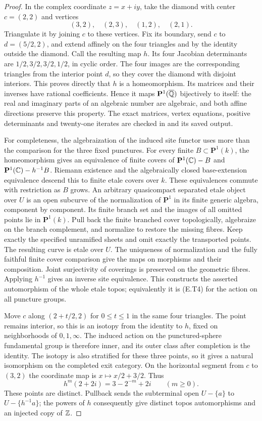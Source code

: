 \begin{proof}
In the complex coordinate $z=x+iy$, take the diamond with center
$c=(2,2)$ and vertices
\[
 (3,2),\quad(2,3),\quad(1,2),\quad(2,1).
\]
Triangulate it by joining $c$ to these vertices.  Fix its boundary,
send $c$ to $d=(5/2,2)$, and extend affinely on the four triangles
and by the identity outside the diamond.  Call the resulting map
$h$.  Its four Jacobian determinants are $1/2,3/2,3/2,1/2$,
in cyclic order.  The four images are the corresponding triangles
from the interior point $d$, so they cover the diamond with
disjoint interiors.  This proves directly that $h$ is a
homeomorphism.  Its matrices and their inverses have rational
coefficients.  Hence it maps $\mathbf P^1(\overline{\mathbb Q})$ bijectively
to itself: the real and imaginary parts of an algebraic number
are algebraic, and both affine directions preserve this property.
The exact matrices, vertex equations, positive determinants and
twenty-one iterates are checked in  and
its saved output.

For completeness, the algebraization of the induced site functor
uses more than the comparison for the three fixed punctures.
For every finite $B\subset\mathbf P^1(k)$, the homeomorphism gives
an equivalence of finite covers of
$\mathbf P^1(\mathbb C)-B$ and
$\mathbf P^1(\mathbb C)-h^{-1}B$.  Riemann existence and the
algebraically closed base-extension equivalence descend this to
finite etale covers over $k$.  These equivalences commute with
restriction as $B$ grows.  An arbitrary quasicompact separated
etale object over $U$ is an open subcurve of the normalization
of $\mathbf P^1$ in its finite generic algebra, component by
component.  Its finite branch set and the images of all omitted
points lie in $\mathbf P^1(k)$.  Pull back the finite branched
cover topologically, algebraize on the branch complement, and
normalize to restore the missing fibres.  Keep exactly the
specified unramified sheets and omit exactly the transported
points.  The resulting curve is etale over $U$.
The uniqueness of normalization and the fully faithful finite
cover comparison give the maps on morphisms and their
composition.  Joint surjectivity of coverings is preserved on
the geometric fibres.  Applying $h^{-1}$ gives an inverse site
equivalence.  This constructs the asserted automorphism of the
whole etale topos; equivalently it is (E.T4) for the action on
all puncture groups.

Move $c$ along $(2+t/2,2)$ for $0\leq t\leq1$ in the same four
triangles.  The point remains interior, so this is an isotopy
from the identity to $h$, fixed on neighborhoods of $0,1,\infty$.
The induced action on the punctured-sphere fundamental group is
therefore inner, and its outer class after completion is the
identity.  The isotopy is also stratified for these three points,
so it gives a natural isomorphism on the completed exit category.
On the horizontal segment from $c$ to $(3,2)$ the coordinate
map is $x\mapsto x/2+3/2$.  Thus
\[
             h^m(2+2i)=3-2^{-m}+2i\qquad(m\geq0).
\]
These points are distinct.  Pullback sends the subterminal open
$U-\{a\}$ to $U-\{h^{-1}a\}$; the powers of $h$ consequently
give distinct topos automorphisms and an injected copy of $\mathbb Z$.


\end{proof}
